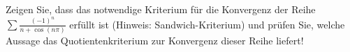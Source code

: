 \item Zeigen Sie, dass das notwendige Kriterium für die Konvergenz der Reihe $\sum\limits \frac{(-1)^n}{n+\cos(n\pi)}$ erfüllt ist (Hinweis: Sandwich-Kriterium) und prüfen Sie, welche Aussage das Quotientenkriterium zur Konvergenz dieser Reihe liefert!